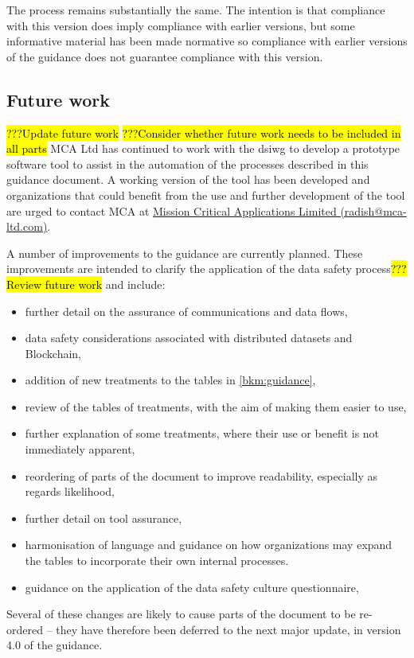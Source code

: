 The process remains substantially the same. The intention is that compliance with this version does imply compliance with earlier versions, but some informative material has been made normative so compliance with earlier versions of the guidance does not guarantee compliance with this version.\cbend\
\subsection*{Future work}
\hl{???Update future work}
\hl{???Consider whether future work needs to be included in all parts}
MCA Ltd has continued to work with the \gls{dsiwg} to develop a prototype software tool to assist in the automation of the processes described in this guidance document.
A working version of the tool has been developed and organizations that could benefit from the use and further development of the tool are urged to contact MCA at \href{mailto:radish@mca-ltd.com}{Mission Critical Applications Limited (radish@mca-ltd.com)}.

A number of improvements to the guidance are currently planned.
These improvements are intended to clarify the application of the data safety process\hl{???Review future work}
and include:
\begin{itemize}
	\item further detail on the assurance of communications and data flows,
	\item data safety considerations associated with distributed \glspl{dataset} and Blockchain,
	\item addition of new \glspl{treatment} to the tables in \autoref{bkm:guidance},
	\item review of the tables of \glspl{treatment}, with the aim of making them easier to use,
	\item further explanation of some \glspl{treatment}, where their use or benefit is not immediately apparent, 
	\item reordering of parts of the document to improve readability, especially as regards likelihood, 
	\item further detail on tool assurance,
	\item harmonisation of language and guidance on how organizations may expand the tables to incorporate their own internal processes.
	\item guidance on the application of the data safety culture questionnaire,
\end{itemize}
Several of these changes are likely to
cause parts of the document to be re-ordered -- they have therefore been deferred to the next major update, in version 4.0 of the guidance.


